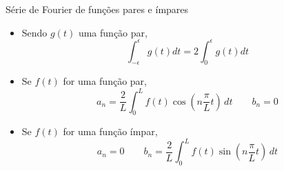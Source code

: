       \begin{slide}[toc=]{Série de Fourier de funções pares e ímpares}
	      {
		      \begin{itemize}
			      \item Sendo $g(t)$ uma \alert{função par},
				      \begin{equation*}
					      \int_{-\epsilon}^\epsilon g(t) dt = 2\int_{0}^\epsilon g(t) dt
				      \end{equation*}
			      \item Se $f(t)$ for uma função par, 
				      \begin{equation*}
					      a_n = \frac{2}{L}\int_0^L f(t)\cos\left ( n\frac{\pi}{L}t\right )\, dt\qquad b_n = 0
				      \end{equation*}
			      \item Se $f(t)$ for uma função ímpar, 
				      \begin{equation*}
					      a_n = 0\qquad b_n=\frac{2}{L}\int_0^L f(t)\sin \left ( n\frac{\pi}{L}t\right )\, dt
				      \end{equation*}
		      \end{itemize}
	      }

      \end{slide}

